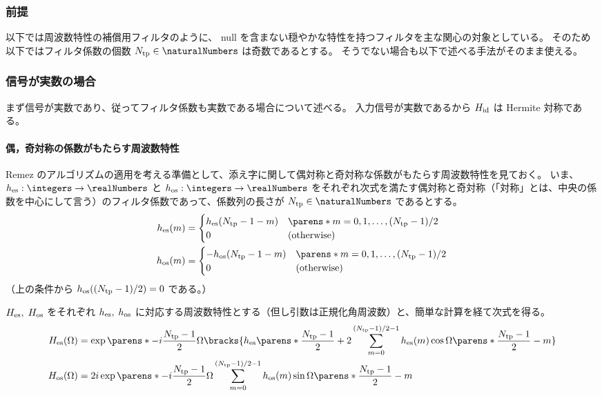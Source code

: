         \subsubsection{前提}
            以下では周波数特性の補償用フィルタのように、 null を含まない穏やかな特性を持つフィルタを主な関心の対象としている。
            そのため以下ではフィルタ係数の個数 $\Ntp\in\naturalNumbers$ は奇数であるとする。
            そうでない場合も以下で述べる手法がそのまま使える。
        \subsubsection{信号が実数の場合}
            まず信号が実数であり、従ってフィルタ係数も実数である場合について述べる。
            入力信号が実数であるから $H_{\text{id}}$ は Hermite 対称である。
            \paragraph{偶，奇対称の係数がもたらす周波数特性}
                \label{偶，奇対称の係数がもたらす周波数特性}
                Remez のアルゴリズムの適用を考える準備として、添え字に関して偶対称と奇対称な係数がもたらす周波数特性を見ておく。
                いま、$\hes:\integers\to\realNumbers$ と $\hos:\integers\to\realNumbers$ をそれぞれ次式を満たす偶対称と奇対称（「対称」とは、中央の係数を中心にして言う）のフィルタ係数であって、係数列の長さが $\Ntp\in\naturalNumbers$ であるとする。
                \begin{align*}
                    \hes(m) &= \begin{cases}
                        \hes(\Ntp-1-m) & \parens*{m =0,1,\dots,(\Ntp-1)/2} \\
                        0 & (\text{otherwise})
                    \end{cases} \\
                    \hos(m) &= \begin{cases}
                        -\hos(\Ntp-1-m) & \parens*{m =0,1,\dots,(\Ntp-1)/2} \\
                        0 & (\text{otherwise})
                    \end{cases}
                \end{align*}
                （上の条件から $h_{\text{os}}((N_{\text{tp}}-1)/2) = 0$ である。）
                \par
                $H_{\text{es}},\;H_{\text{os}}$ をそれぞれ $h_{\text{es}},\;h_{\text{os}}$ に対応する周波数特性とする（但し引数は正規化角周波数）と、簡単な計算を経て次式を得る。
                \begin{align*}
                    \Hes(\Omega) &= \exp\parens*{-i\frac{\Ntp-1}{2}\Omega}\bracks{\hes\parens*{\frac{\Ntp-1}{2}} + 2\sum_{m=0}^{(\Ntp-1)/2-1}{\hes(m)\cos\Omega\parens*{\frac{\Ntp-1}{2}-m}}} \\
                    \Hos(\Omega) &= 2i\exp\parens*{-i\frac{\Ntp-1}{2}\Omega}\sum_{m=0}^{(\Ntp-1)/2-1}{\hos(m)\sin\Omega\parens*{\frac{\Ntp-1}{2}-m}}
                \end{align*}
